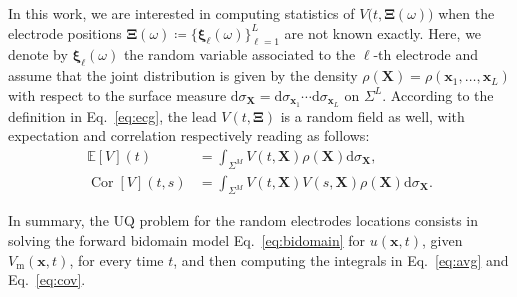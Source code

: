 \documentclass[runningheads]{llncs}
\newcommand{\bs}[1]{\boldsymbol{#1}}
\newcommand{\Vm}{V_\mathrm{m}}
\newcommand{\vX}{\mathbf{X}}
\newcommand{\vx}{\mathbf{x}}
\newcommand{\dd}{\mathrm{d}}
\newcommand{\EE}{\mathbb{E}}
\DeclareMathOperator{\Cor}{Cor}
\begin{document}
In this work, we are interested in computing statistics of
$V\big(t,{\bs\Xi}(\omega)\big)$ when
the electrode positions
${\bs\Xi(\omega)\coloneqq\{{\bs\xi}_\ell(\omega)\}_{\ell=1}^L}$ are not known exactly.
Here, we
denote by ${\bs\xi}_\ell(\omega)$ the random variable associated to the $\ell$-th
electrode and assume that the joint distribution is given by the density
$\rho(\vX) = \rho(\vx_1,\ldots,\vx_L)$ with respect to the surface measure
$\dd\sigma_{\vX} = \dd\sigma_{\vx_1}\cdots\dd\sigma_{\vx_L}$
on $\Sigma^L$.
According to the definition in Eq.~\eqref{eq:ecg}, the lead $V(t,{\bs\Xi})$
is a random field as well, with expectation and correlation respectively
reading as follows:
\begin{align}
\EE[V](t) &= \int_{\Sigma^M} V(t,\vX) \rho(\vX)\dd\sigma_{\vX},
\label{eq:avg} \\
\Cor[V](t,s) &= \int_{\Sigma^M} V(t,\vX) V(s,\vX)\rho(\vX)
\dd\sigma_{\vX}. \label{eq:cov}
\end{align}

In summary, the UQ problem for the random electrodes locations
consists in solving the forward bidomain model Eq.~\eqref{eq:bidomain}
for $u(\vx,t)$, given $\Vm(\vx,t)$, for every time $t$, and then computing
the integrals in Eq.~\eqref{eq:avg} and Eq.~\eqref{eq:cov}.
\end{document}
